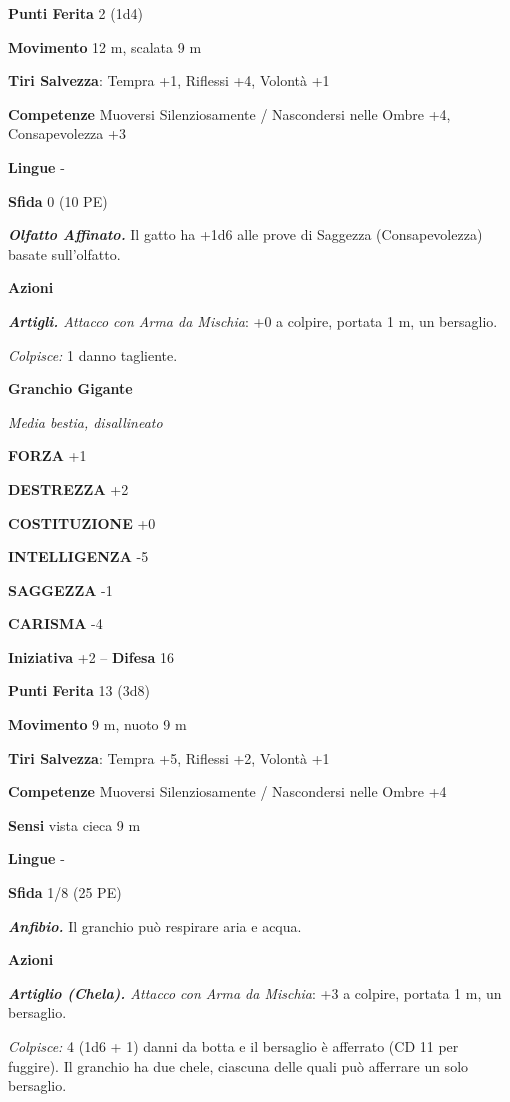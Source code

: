 \begin{multicols}{2}
\textbf{Punti Ferita} 2 (1d4)

\textbf{Movimento} 12 m, scalata 9 m

\textbf{Tiri Salvezza}:  Tempra +1, Riflessi +4, Volontà +1

\textbf{Competenze} Muoversi Silenziosamente / Nascondersi nelle Ombre +4, Consapevolezza +3

\textbf{Lingue} -

\textbf{Sfida} 0 (10 PE)

\emph{\textbf{Olfatto Affinato.}} Il gatto ha +1d6 alle prove di Saggezza (Consapevolezza) basate sull'olfatto.

\textbf{Azioni}

\emph{\textbf{Artigli.} Attacco con Arma da Mischia}: +0 a colpire, portata 1 m, un bersaglio.

\emph{Colpisce:} 1 danno tagliente.

\medskip\textbf{Granchio Gigante}

\emph{Media bestia, disallineato}

\textbf{FORZA} +1

\textbf{DESTREZZA} +2

\textbf{COSTITUZIONE} +0

\textbf{INTELLIGENZA} -5

\textbf{SAGGEZZA} -1

\textbf{CARISMA} -4

\textbf{Iniziativa} +2 -- \textbf{Difesa} 16

\textbf{Punti Ferita} 13 (3d8)

\textbf{Movimento} 9 m, nuoto 9 m

\textbf{Tiri Salvezza}: Tempra +5, Riflessi +2, Volontà +1

\textbf{Competenze} Muoversi Silenziosamente / Nascondersi nelle Ombre +4

\textbf{Sensi} vista cieca 9 m

\textbf{Lingue} -

\textbf{Sfida} 1/8 (25 PE)

\emph{\textbf{Anfibio.}} Il granchio può respirare aria e acqua.

\textbf{Azioni}

\emph{\textbf{Artiglio (Chela).} Attacco con Arma da Mischia}: +3 a colpire, portata 1 m, un bersaglio.

\emph{Colpisce:} 4 (1d6 + 1) danni da botta e il bersaglio è afferrato (CD 11 per fuggire). Il granchio ha due chele, ciascuna delle quali può afferrare un solo bersaglio.


\end{multicols}
